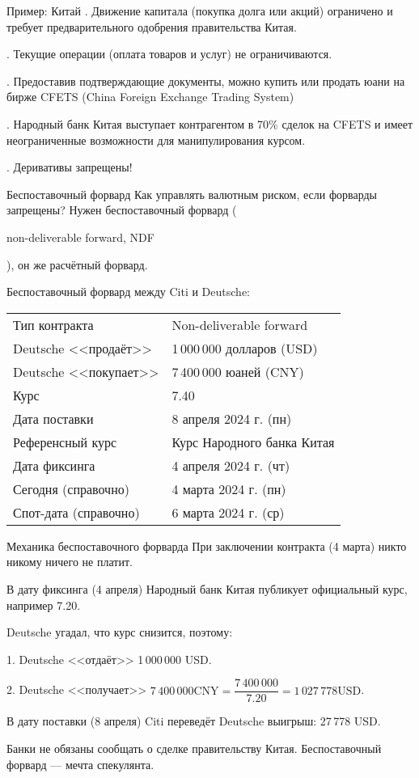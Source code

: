 \documentclass{beamer}
\newcommand{\en}[1]{\begin{otherlanguage}{english}#1\end{otherlanguage}}
\begin{document}
\begin{frame}{Пример: Китай}
. Движение капитала (покупка долга или акций) ограничено и требует предварительного одобрения правительства Китая.

. Текущие операции (оплата товаров и услуг) не ограничиваются. 

. Предоставив подтверждающие документы, можно купить или продать юани на бирже CFETS (China Foreign Exchange Trading System)

. Народный банк Китая выступает контрагентом в 70\% сделок на CFETS и имеет неограниченные возможности для манипулирования курсом.

. Деривативы запрещены!
\end{frame}



\begin{frame}{Беспоставочный форвард}
\justify
Как управлять валютным риском, если форварды запрещены? Нужен \alert{беспоставочный форвард} (\en{non-deliverable forward, NDF}), он же расчётный форвард.

\justify
Беспоставочный форвард между Citi и Deutsche:

\justify
\centering
\begin{tabular}{l|l}
	Тип контракта 		   & Non-deliverable forward		\\
	Deutsche <<продаёт>>  & 1\,000\,000 долларов (USD)	\\
	Deutsche <<покупает>> & 7\,400\,000 юаней (CNY)		\\
	Курс		 		      & 7.40 						\\
	Дата поставки		   & 8 апреля 2024 г. (пн) \\
	Референсный курс	   & Курс Народного банка Китая	\\
	Дата фиксинга		   & 4 апреля 2024 г. (чт) \\
	Сегодня (справочно)	& 4 марта 2024 г. (пн) \\
	Спот-дата (справочно) & 6 марта 2024 г. (ср)
\end{tabular}
\end{frame}



\begin{frame}{Механика беспоставочного форварда}
\justify
При заключении контракта (4 марта) никто никому ничего не платит.

\justify
В дату фиксинга (4 апреля) Народный банк Китая публикует официальный курс, например 7.20.

\justify
Deutsche угадал, что курс снизится, поэтому:

1. Deutsche <<отдаёт>> 1\,000\,000 USD.

2. Deutsche <<получает>> $7\,400\,000 \text{CNY} = \dfrac{7\,400\,000}{7.20} = 1\,027\,778 \text{USD}$.

\justify
В дату поставки (8 апреля) Citi переведёт Deutsche выигрыш: 27\,778 USD.

\justify Банки не обязаны сообщать о сделке правительству Китая. Беспоставочный форвард --- мечта спекулянта.
\end{frame}
\end{document}
